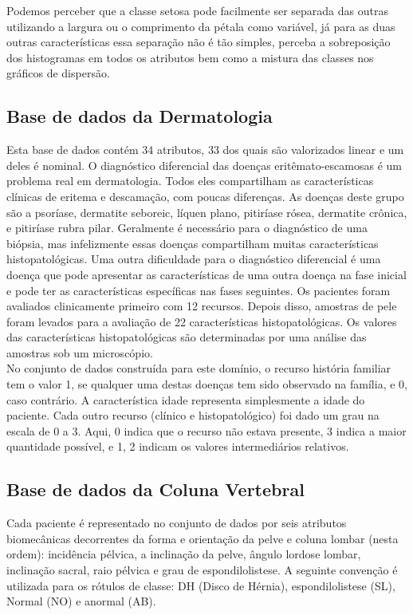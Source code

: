 \documentclass[a4paper]{article}
\begin{document}
Podemos perceber que a classe setosa pode facilmente ser separada das outras utilizando a largura ou o comprimento da pétala como variável, já para as duas outras características essa separação não é tão simples, perceba a sobreposição dos histogramas em todos os atributos bem como a mistura das classes nos gráficos de dispersão.


\subsection{Base de dados da Dermatologia}

Esta base de dados contém 34 atributos, 33 dos quais são valorizados linear e um deles é nominal. O diagnóstico diferencial das doenças eritêmato-escamosas é um problema real em dermatologia. Todos eles compartilham as características clínicas de eritema e descamação, com poucas diferenças. As doenças deste grupo são a psoríase, dermatite seboreic, líquen plano, pitiríase rósea, dermatite crônica, e pitiríase rubra pilar. Geralmente é necessário para o diagnóstico de uma biópsia, mas infelizmente essas doenças compartilham muitas características histopatológicas. Uma outra dificuldade para o diagnóstico diferencial é uma doença que pode apresentar as características de uma outra doença na fase inicial e pode ter as características específicas nas fases seguintes. Os pacientes foram avaliados clinicamente primeiro com 12 recursos. Depois disso, amostras de pele foram levados para a avaliação de 22 características histopatológicas. Os valores das características histopatológicas são determinadas por uma análise das amostras sob um microscópio. \\

No conjunto de dados construída para este domínio, o recurso história familiar tem o valor 1, se qualquer uma destas doenças tem sido observado na família, e 0, caso contrário. A característica idade representa simplesmente a idade do paciente. Cada outro recurso (clínico e histopatológico) foi dado um grau na escala de 0 a 3. Aqui, 0 indica que o recurso não estava presente, 3 indica a maior quantidade possível, e 1, 2 indicam os valores intermediários relativos.

\subsection{Base de dados da Coluna Vertebral}

Cada paciente é representado no conjunto de dados por seis atributos biomecânicas decorrentes da forma e orientação da pelve e coluna lombar (nesta ordem): incidência pélvica, a inclinação da pelve, ângulo lordose lombar, inclinação sacral, raio pélvica e grau de espondilolistese. A seguinte convenção é utilizada para os rótulos de classe: DH (Disco de Hérnia), espondilolistese (SL), Normal (NO) e anormal (AB).\\
\end{document}
